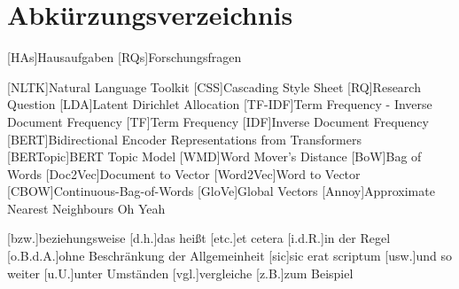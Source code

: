\chapter*{Abkürzungsverzeichnis}


[HAs]{Hausaufgaben}
[RQs]{Forschungsfragen}

\begin{acronym}[XXXXXX]
    [NLTK]{Natural Language Toolkit}
    [CSS]{Cascading Style Sheet}
    [RQ]{Research Question}
    [LDA]{Latent Dirichlet Allocation}
    [TF-IDF]{Term Frequency - Inverse Document Frequency}
    [TF]{Term Frequency}
    [IDF]{Inverse Document Frequency}
    [BERT]{Bidirectional Encoder Representations from Transformers}
    [BERTopic]{BERT Topic Model}
    [WMD]{Word Mover's Distance}
    [BoW]{Bag of Words}
    [Doc2Vec]{Document to Vector}
    [Word2Vec]{Word to Vector}
    [CBOW]{Continuous-Bag-of-Words}
    [GloVe]{Global Vectors}
    [Annoy]{Approximate Nearest Neighbours Oh Yeah}

    \vspace{\parskip}

    [bzw.]{beziehungsweise}
    [d.h.]{das heißt}
    [etc.]{et cetera}
    [i.d.R.]{in der Regel}
    [o.B.d.A.]{ohne Beschränkung der Allgemeinheit}
    [sic]{sic erat scriptum}
    [usw.]{und so weiter}
    [u.U.]{unter Umständen}
    [vgl.]{vergleiche}
    [z.B.]{zum Beispiel}
\end{acronym}
